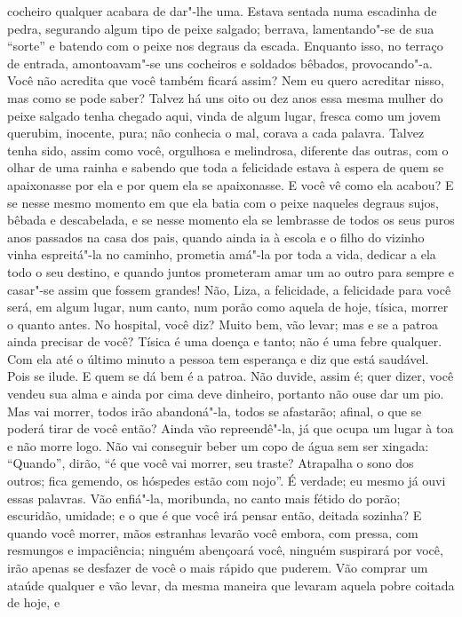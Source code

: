 cocheiro qualquer acabara de dar"-lhe uma. Estava sentada numa escadinha
de pedra, segurando algum tipo de peixe salgado; berrava, lamentando"-se
de sua “sorte” e batendo com o peixe nos degraus da escada. Enquanto
isso, no terraço de entrada, amontoavam"-se uns cocheiros e soldados
bêbados, provocando"-a. Você não acredita que você também ficará assim?
Nem eu quero acreditar nisso, mas como se pode saber? Talvez há uns oito
ou dez anos essa mesma mulher do peixe salgado tenha chegado aqui,
vinda de algum lugar, fresca como um jovem querubim, inocente, pura;
não conhecia o mal, corava a cada palavra. Talvez tenha sido, assim
como você, orgulhosa e melindrosa, diferente das outras, com o olhar de
uma rainha e sabendo que toda a felicidade estava à espera de quem se
apaixonasse por ela e por quem ela se apaixonasse. E você vê como ela
acabou? E se nesse mesmo momento em que ela batia com o peixe naqueles
degraus sujos, bêbada e descabelada, e se nesse momento ela se
lembrasse de todos os seus puros anos passados na casa dos pais, quando
ainda ia à escola e o filho do vizinho vinha espreitá"-la no caminho,
prometia amá"-la por toda a vida, dedicar a ela todo o seu destino, e
quando juntos prometeram amar um ao outro para sempre e casar"-se assim
que fossem grandes! Não, Liza, a felicidade, a felicidade para você
será, em algum lugar, num canto, num porão como aquela de hoje, tísica,
morrer o quanto antes. No hospital, você diz? Muito bem, vão levar; mas
e se a patroa ainda precisar de você? Tísica é uma doença e tanto; não
é uma febre qualquer. Com ela até o último minuto a pessoa tem
esperança e diz que está saudável. Pois se ilude. E quem se dá bem é a
patroa. Não duvide, assim é; quer dizer, você vendeu sua alma e ainda
por cima deve dinheiro, portanto não ouse dar um pio. Mas vai morrer,
todos irão abandoná"-la, todos se afastarão; afinal, o que se poderá
tirar de você então? Ainda vão repreendê"-la, já que ocupa um lugar à
toa e não morre logo. Não vai conseguir beber um copo de água sem ser
xingada: “Quando”, dirão, “é que você vai morrer, seu traste? Atrapalha
o sono dos outros; fica gemendo, os hóspedes estão com nojo”. É
verdade; eu mesmo já ouvi essas palavras. Vão enfiá"-la, moribunda, no
canto mais fétido do porão; escuridão, umidade; e o que é que você irá
pensar então, deitada sozinha? E quando você morrer, mãos estranhas
levarão você embora, com pressa, com resmungos e impaciência; ninguém
abençoará você, ninguém suspirará por você, irão apenas se desfazer de
você o mais rápido que puderem. Vão comprar um ataúde qualquer e vão
levar, da mesma maneira que levaram aquela pobre coitada de hoje, e
